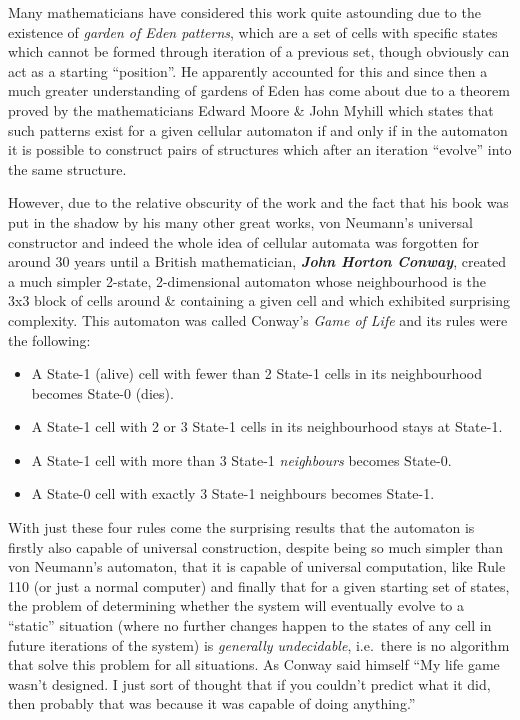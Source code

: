 Many mathematicians have considered this work quite astounding due to
the existence of \emph{garden of Eden patterns}, which are a set of
cells with specific states which cannot be formed through iteration of a
previous set, though obviously can act as a starting ``position''. He
apparently accounted for this and since then a much greater
understanding of gardens of Eden has come about due to a theorem proved
by the mathematicians Edward Moore \& John Myhill which states that such
patterns exist for a given cellular automaton if and only if in the
automaton it is possible to construct pairs of structures which after an
iteration ``evolve'' into the same structure.

However, due to the relative obscurity of the work and the fact that his
book was put in the shadow by his many other great works, von Neumann's
universal constructor and indeed the whole idea of cellular automata was
forgotten for around 30 years until a British mathematician,
\textbf{\emph{John Horton Conway}}, created a much simpler 2-state,
2-dimensional automaton whose neighbourhood is the 3x3 block of cells
around \& containing a given cell and which exhibited surprising
complexity. This automaton was called Conway's \emph{Game of Life} and
its rules were the following:

\begin{itemize}
\item
  A State-1 (alive) cell with fewer than 2 State-1 cells in its
  neighbourhood becomes State-0 (dies).
\item
  A State-1 cell with 2 or 3 State-1 cells in its neighbourhood stays at
  State-1.
\item
  A State-1 cell with more than 3 State-1 \emph{neighbours} becomes
  State-0.
\item
  A State-0 cell with exactly 3 State-1 neighbours becomes State-1.
\end{itemize}

With just these four rules come the surprising results that the
automaton is firstly also capable of universal construction, despite
being so much simpler than von Neumann's automaton, that it is capable
of universal computation, like Rule 110 (or just a normal computer) and
finally that for a given starting set of states, the problem of
determining whether the system will eventually evolve to a ``static''
situation (where no further changes happen to the states of any cell in
future iterations of the system) is \emph{generally undecidable},
i.e.~there is no algorithm that solve this problem for all situations.
As Conway said himself ``My life game wasn't designed. I just sort of
thought that if you couldn't predict what it did, then probably that was
because it was capable of doing anything.''

